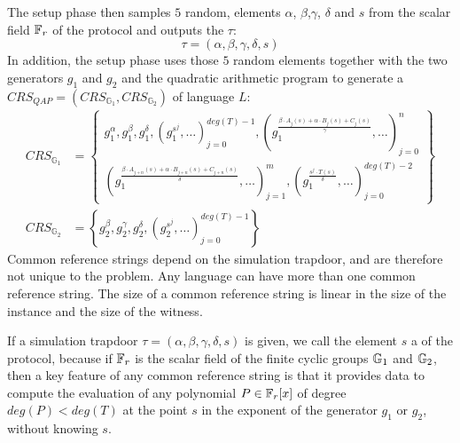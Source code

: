 The setup phase then samples $5$ random,  elements $\alpha$, $\beta$,$\gamma$, $\delta$ and $s$ from the scalar field $\mathbb{F}_r$ of the protocol and outputs the  $\tau$:
\begin{equation}
\tau = (\alpha, \beta, \gamma, \delta, s)
\end{equation}
In addition, the setup phase uses those $5$ random elements together with the two generators $g_1$ and $g_2$  and the quadratic arithmetic program to generate a  $CRS_{QAP}= (CRS_{\mathbb{G}_1},CRS_{\mathbb{G}_2})$ of language $L$:
\begin{align*}
CRS_{\mathbb{G}_{1}} &= \textstyle\left\{ \begin{array}{c}
g_1^\alpha,g_1^\beta,g_1^\delta,\left(g_1^{s^j},\ldots\right)_{j=0}^{deg(T)-1},
\left(g_1^{\frac{\beta\cdot A_{j}(s)+\alpha\cdot B_{j}(s)+C_{j}(s)}{\gamma}},\ldots\right)_{j=0}^n\\
\left(g_1^{\frac{\beta\cdot A_{j+n}(s)+\alpha\cdot B_{j+n}(s)+C_{j+n}(s)}{\delta}},\ldots\right)_{j=1}^m,\left(g_1^{\frac{s^{j}\cdot T(s)}{\delta}},\ldots\right)_{j=0}^{deg(T)-2}
\end{array}\right\} \\
CRS_{\mathbb{G}_{2}} &= \left\{g_2^\beta ,g_2^\gamma,g_2^\delta,\left(g_2^{s^j},\ldots\right) _{j=0}^{deg(T)-1}\right\}
\end{align*}
Common reference strings depend on the simulation trapdoor, and are therefore not unique to the problem. Any language can have more than one common reference string. The  size of a common reference string is linear in the size of the instance and the size of the witness.

If a simulation trapdoor $\tau = (\alpha,\beta,\gamma,\delta, s)$ is given, we call the element $s$ a  of the protocol, because if $\mathbb{F}_r$ is the scalar field of the finite cyclic groups $\mathbb{G}_1$ and $\mathbb{G}_2$, then a key feature of any common reference string is that it provides data to compute the evaluation of any polynomial $P\in \mathbb{F}_r[x]$ of degree $deg(P)<deg(T)$ at the point $s$ in the exponent of the generator $g_1$ or $g_2$, without knowing $s$.

